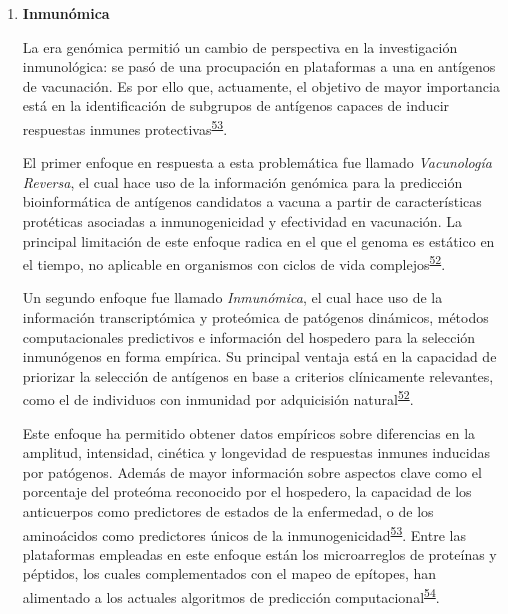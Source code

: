 \documentclass[]{article}
\begin{document}
\begin{enumerate}
  \begin{enumerate}
  \def\labelenumii{\roman{enumii}.}
  \item
    \textbf{Inmunómica}

    La era genómica permitió un cambio de perspectiva en la
    investigación inmunológica: se pasó de una procupación en
    plataformas a una en antígenos de vacunación. Es por ello que,
    actuamente, el objetivo de mayor importancia está en la
    identificación de subgrupos de antígenos capaces de inducir
    respuestas inmunes
    protectivas\textsuperscript{\protect\hyperlink{ref-Davies2015Large}{53}}.

    El primer enfoque en respuesta a esta problemática fue llamado
    \emph{Vacunología Reversa}, el cual hace uso de la información
    genómica para la predicción bioinformática de antígenos candidatos a
    vacuna a partir de características protéticas asociadas a
    inmunogenicidad y efectividad en vacunación. La principal limitación
    de este enfoque radica en el que el genoma es estático en el tiempo,
    no aplicable en organismos con ciclos de vida
    complejos\textsuperscript{\protect\hyperlink{ref-immunomics2016}{52}}.

    Un segundo enfoque fue llamado \emph{Inmunómica}, el cual hace uso
    de la información transcriptómica y proteómica de patógenos
    dinámicos, métodos computacionales predictivos e información del
    hospedero para la selección inmunógenos en forma empírica. Su
    principal ventaja está en la capacidad de priorizar la selección de
    antígenos en base a criterios clínicamente relevantes, como el de
    individuos con inmunidad por adquicisión
    natural\textsuperscript{\protect\hyperlink{ref-immunomics2016}{52}}.

    Este enfoque ha permitido obtener datos empíricos sobre diferencias
    en la amplitud, intensidad, cinética y longevidad de respuestas
    inmunes inducidas por patógenos. Además de mayor información sobre
    aspectos clave como el porcentaje del proteóma reconocido por el
    hospedero, la capacidad de los anticuerpos como predictores de
    estados de la enfermedad, o de los aminoácidos como predictores
    únicos de la
    inmunogenicidad\textsuperscript{\protect\hyperlink{ref-Davies2015Large}{53}}.
    Entre las plataformas empleadas en este enfoque están los
    microarreglos de proteínas y péptidos, los cuales complementados con
    el mapeo de epítopes, han alimentado a los actuales algoritmos de
    predicción
    computacional\textsuperscript{\protect\hyperlink{ref-carmona2015peptide}{54}}.
  \end{enumerate}
\end{enumerate}
\end{document}

